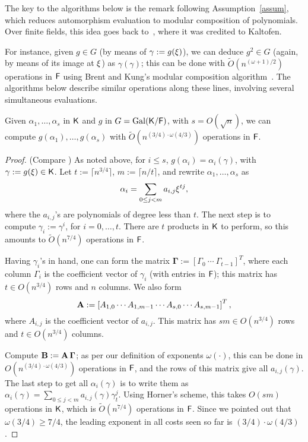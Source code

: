 The key to the algorithms below is the remark following
Assumption~\ref{assum}, which reduces automorphism evaluation to
modular composition of polynomials.  Over finite fields, this idea goes back
to~\cite{GaSh92}, where it was credited to Kaltofen.

For instance, given $g \in G$ (by means of $\gamma:=g(\xi)$), we can
deduce $g^2 \in G$ (again, by means of its image at $\xi$) as
$\gamma(\gamma)$; this can be done with $\tilde{O}(n^{(\omega+1)/2})$
operations in ${\mathsf{F}}$ using Brent and Kung's modular composition
algorithm~\citep{BrKu78}. The algorithms below describe similar operations
along these lines, involving several simultaneous evaluations.

\begin{lemma}
  \label{lem:modcom}
  Given $\alpha_1,\dots,\alpha_s$ in ${\mathsf{K}}$ and $g$ in $G =
  \mathrm{Gal}({\mathsf{K}}/{\mathsf{F}})$, with $s = O(\sqrt{n})$, we can compute
  $g(\alpha_1),\dots,g(\alpha_s)$ with $\tilde
  O(n^{(3/4)\cdot\omega(4/3)})$ operations in ${\mathsf{F}}$.
\end{lemma}
\begin{proof}
(Compare \cite[Lemma~3]{KalSho98}) As noted above, for $i\le s$,
  $g(\alpha_i) = \alpha_i(\gamma)$, with $\gamma := g(\xi) \in {\mathsf{K}}$.
  Let $t := \lceil n^{3/4} \rceil$, $m:=\lceil n/t\rceil$, and rewrite $\alpha_1 , \ldots , \alpha_s$ as 
$$\alpha_i = \sum_{0 \leq j < m} a_{i,j}\xi^{tj},$$ where the
  $a_{i,j}$'s are polynomials of degree less than $t$. The next step
  is to compute $\gamma_i := \gamma^i$, for $i = 0 , \ldots , t$.
  There are $t$ products in ${\mathsf{K}}$ to perform, so this amounts to
  $\tilde{O}(n^{7/4})$ operations in ${\mathsf{F}}$.

  Having $\gamma_i$'s in hand, one can form the matrix
  $\boldsymbol{\Gamma} := \left[ \Gamma_0 ~ \cdots ~ \Gamma_{t-1}
    \right]^T$, where each column $\Gamma_i$ is the coefficient vector
  of $\gamma_i$ (with entries in ${\mathsf{F}}$); this matrix has $t \in
  O(n^{3/4})$ rows and $n$ columns. We also form
  $$\mat A := \left[{A}_{1,0} \cdots {A}_{1,m-1} \cdots
    {A}_{s,0} \cdots {A}_{s,m-1}\right]^T,$$ where
  ${A}_{i,j}$ is the coefficient vector of $a_{i,j}$. This matrix 
  has $s m \in O(n^{3/4})$ rows and $t \in O(n^{3/4})$ columns.

  Compute $\mat B:=\mat A\, \boldsymbol{\Gamma}$; as per our
  definition of exponents $\omega(\cdot )$, this can be done in
  $O(n^{(3/4)\cdot \omega(4/3)})$ operations in ${\mathsf{F}}$, and the rows of this matrix
  give all $a_{i,j}(\gamma)$.  The last step to get all
  $\alpha_i(\gamma)$ is to write them as $\alpha_i(\gamma) = \sum_{0
    \leq j < m} a_{i,j}(\gamma) \gamma_t^{j}.$ Using Horner's scheme,
  this takes $O(sm)$ operations in ${\mathsf{K}}$, which is $\tilde{O}(n^{7/4})$
  operations in ${\mathsf{F}}$. Since we pointed out that $\omega(3/4) \ge 7/4$,
  the leading exponent in all costs seen so far is
  $(3/4)\cdot\omega(4/3)$.
\end{proof}


